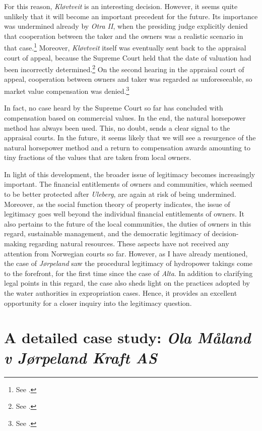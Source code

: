 For this reason, {\it Kløvtveit} is an interesting decision. However, it seems quite unlikely that it will become an important precedent for the future. Its importance was undermined already by {\it Otra II}, when the presiding judge explicitly denied that cooperation between the taker and the owners was a realistic scenario in that case.\footnote{See \cite[69-71]{otra13}.} Moreover, {\it Kløvtveit} itself was eventually sent back to the appraisal court of appeal, because the Supreme Court held that the date of valuation had been incorrectly determined.\footnote{See \cite[35-39]{klovtveit11}.} On the second hearing in the appraisal court of appeal, cooperation between owners and taker was regarded as unforeseeable, so market value compensation was denied.\footnote{See \cite{klovtveit13}.}

In fact, no case heard by the Supreme Court so far has concluded with compensation based on commercial  values. In the end, the natural horsepower method has always been used. This, no doubt, sends a clear signal to the appraisal courts. In the future, it seems likely that we will see a resurgence of the natural horsepower method and a return to compensation awards amounting to tiny fractions of the values that are taken from local owners.

In light of this development, the broader issue of legitimacy becomes increasingly important. The financial entitlements of owners and communities, which seemed to be better protected after {\it Uleberg}, are again at risk of being undermined. Moreover, as the social function theory of property indicates, the issue of legitimacy goes well beyond the individual financial entitlements of owners. It also pertains to the future of the local communities, the duties of owners in this regard, sustainable management, and the democratic legitimacy of decision-making regarding natural resources. These aspects have not received any attention from Norwegian courts so far. However, as I have already mentioned, the case of {\it Jørpeland} saw the procedural legitimacy of hydropower takings come to the forefront, for the first time since the case of {\it Alta}. In addition to clarifying legal points in this regard, the case also sheds light on the practices adopted by the water authorities in expropriation cases. Hence, it provides an excellent opportunity for a closer inquiry into the legitimacy question.

\section{A detailed case study: {\it Ola Måland v Jørpeland Kraft AS}}\label{sec:5:6}

